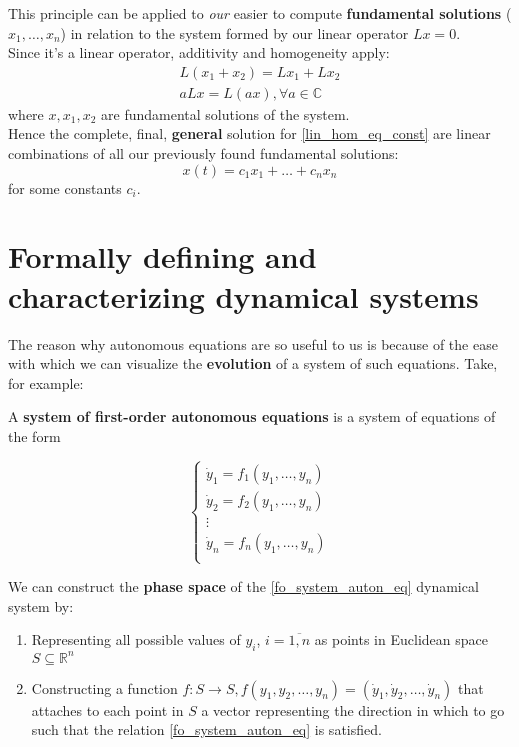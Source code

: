 This principle can be applied to \textit{our} easier to compute \textbf{fundamental solutions} ($x_1,\dots,x_n$) in relation to the system formed by our linear operator $Lx =0 $.
\\

Since it's a linear operator, additivity and homogeneity apply:
\begin{gather*}
    L(x_1+x_2) = Lx_1 + Lx_2\\
    aLx = L(ax) , \forall a \in \mathbb{C}
\end{gather*}
where $x,x_1,x_2$ are fundamental solutions of the system.\\
Hence the complete, final, \textbf{general} solution for \ref{lin_hom_eq_const} are linear combinations of all our previously found fundamental solutions:
\[
    x(t) = c_1 x_1 + \dots + c_nx_n
\]
for some constants $c_i$.


\section{Formally defining and characterizing dynamical systems}
The reason why autonomous equations are so useful to us is because of the ease with which we can visualize the \textbf{ evolution} of a system of such equations.
Take, for example:
\begin{definition}

    A \textbf{ system of first-order autonomous equations} is a system of equations of the form

    \begin{equation}\label{fo_system_auton_eq}
        \begin{cases}
            \dot{y}_1 = f_1(y_1,\dots, y_n) \\
            \dot{y}_2 = f_2(y_1,\dots, y_n) \\
            \vdots                          \\
            \dot{y}_n = f_n(y_1,\dots, y_n) \\
        \end{cases}
    \end{equation}

\end{definition}

\begin{definition}
    We can construct the \textbf{phase space} of the \ref{fo_system_auton_eq} dynamical system by:

    \begin{enumerate}
        \item Representing all possible values of $y_i$, $ i = \overline{1,n}$ as points in Euclidean space $S \subseteq \mathbb{R}^n$

        \item Constructing a function $f : S \rightarrow S, f(y_1,y_2,\dots,y_n) = (\dot{y}_1,\dot{y}_2,\dots,\dot{y}_n)$ that attaches to each point in $S$ a vector representing the direction in which to go such that the relation \ref{fo_system_auton_eq} is satisfied.

    \end{enumerate}
\end{definition}


